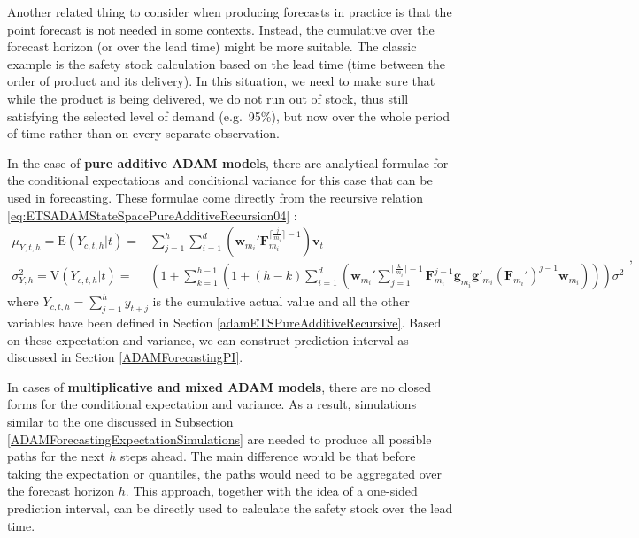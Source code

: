 \documentclass[
]{book}
\theoremstyle{definition}
\theoremstyle{definition}
\theoremstyle{definition}
\theoremstyle{definition}
\theoremstyle{remark}
\begin{document}
Another related thing to consider when producing forecasts in practice is that the point forecast is not needed in some contexts. Instead, the cumulative over the forecast horizon (or over the lead time) might be more suitable. The classic example is the safety stock calculation based on the lead time (time between the order of product and its delivery). In this situation, we need to make sure that while the product is being delivered, we do not run out of stock, thus still satisfying the selected level of demand (e.g.~95\%), but now over the whole period of time rather than on every separate observation.

In the case of \textbf{pure additive ADAM models}, there are analytical formulae for the conditional expectations and conditional variance for this case that can be used in forecasting. These formulae come directly from the recursive relation \eqref{eq:ETSADAMStateSpacePureAdditiveRecursion04} \citep[for derivations in a simpler case, see for example,][\citet{Svetunkov2017}]{Hyndman2008b}:
\begin{equation}
  \begin{aligned}
    \mu_{Y,t,h} = \text{E}(Y_{c,t,h}|t) = & \sum_{j=1}^h \sum_{i=1}^d \left(\mathbf{w}_{m_i}' \mathbf{F}_{m_i}^{\lceil\frac{j}{m_i}\rceil-1} \right) \mathbf{v}_{t} \\
    \sigma^2_{Y,h} = \text{V}(Y_{c,t,h}|t) = & \left(1 + \sum_{k=1}^{h-1} \left(1+ (h-k) \sum_{i=1}^d \left(\mathbf{w}_{m_i}' \sum_{j=1}^{\lceil\frac{k}{m_i}\rceil-1} \mathbf{F}_{m_i}^{j-1} \mathbf{g}_{m_i} \mathbf{g}'_{m_i} (\mathbf{F}_{m_i}')^{j-1} \mathbf{w}_{m_i} \right) \right) \right) \sigma^2
  \end{aligned},
  \label{eq:ETSADAMStateSpacePureAdditiveRecursionMeanAndVarianceCumulative}
\end{equation}
where \(Y_{c,t,h}=\sum_{j=1}^h y_{t+j}\) is the cumulative actual value and all the other variables have been defined in Section \ref{adamETSPureAdditiveRecursive}. Based on these expectation and variance, we can construct prediction interval as discussed in Section \ref{ADAMForecastingPI}.

In cases of \textbf{multiplicative and mixed ADAM models}, there are no closed forms for the conditional expectation and variance. As a result, simulations similar to the one discussed in Subsection \ref{ADAMForecastingExpectationSimulations} are needed to produce all possible paths for the next \(h\) steps ahead. The main difference would be that before taking the expectation or quantiles, the paths would need to be aggregated over the forecast horizon \(h\). This approach, together with the idea of a one-sided prediction interval, can be directly used to calculate the safety stock over the lead time.
\end{document}
